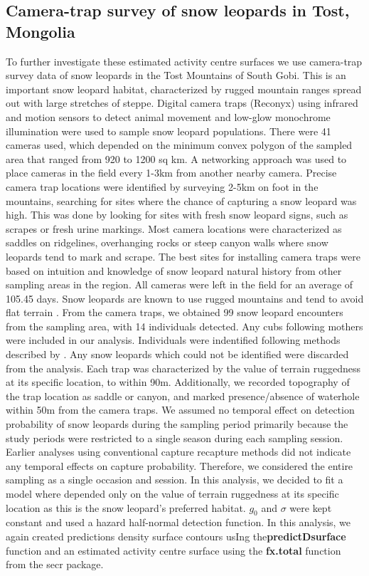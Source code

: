 \documentclass[a4paper,12pt]{article}
\begin{document}
\subsection{Camera-trap survey of snow leopards in Tost, Mongolia}
To further investigate these estimated activity centre surfaces we use camera-trap survey data of snow leopards in the Tost Mountains of South Gobi. This is an important snow leopard habitat, characterized by rugged mountain ranges spread out with large stretches of steppe. Digital camera traps (Reconyx\texttrademark) using infrared and motion sensors to detect animal movement and low-glow monochrome illumination were used to sample snow leopard populations.  There were 41 cameras used, which depended on the minimum convex polygon of the sampled area that ranged from 920 to 1200 sq km.  A networking approach was used to place cameras in the field every 1-3km from another nearby camera. Precise camera trap locations were identified by surveying 2-5km on foot in the mountains, searching for sites where the chance of capturing a snow leopard was high. This was done by looking for sites with fresh snow leopard signs, such as scrapes or fresh urine markings. Most camera locations were characterized as saddles on ridgelines, overhanging rocks or steep canyon walls where snow leopards tend to mark and scrape. The best sites for installing camera traps were based on intuition and knowledge of snow leopard natural history from other sampling areas in the region. All cameras were left in the field for an average of 105.45 days. Snow leopards are known to use rugged mountains and tend to avoid flat terrain \citep*{Johansson2015}. From the camera traps, we obtained 99 snow leopard encounters from the sampling area, with 14 individuals detected. Any cubs following mothers were included in our analysis. Individuals were indentified following methods described by \citep*{Sharma2014}. Any snow leopards which could not be identified were discarded from the analysis. Each trap was characterized by the value of terrain ruggedness at its specific location, to within 90m. Additionally, we recorded topography of the trap location as saddle or canyon, and marked presence/absence of waterhole within 50m from the camera traps. We assumed no temporal effect on detection probability of snow leopards during the sampling period primarily because the study periods were restricted to a single season during each sampling session. Earlier analyses using conventional capture recapture methods did not indicate any temporal effects on capture probability. Therefore, we considered the entire sampling as a single occasion and session. In this analysis, we decided to fit a model where depended only on the value of terrain ruggedness at its specific location as this is the snow leopard's preferred habitat. $g_0$ and $\sigma$ were kept constant and used a hazard half-normal detection function. In this analysis, we again created predictions density surface contours usIng the\textbf{predictDsurface} function and an estimated activity centre surface using the \textbf{fx.total} function from the secr package.
\end{document}
